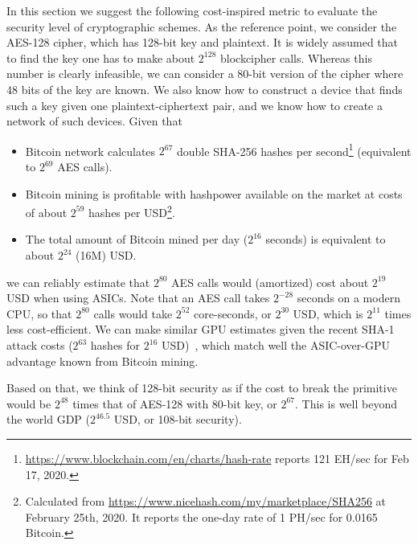 \documentclass[a4paper]{article}
\begin{document}
In this section we suggest the following cost-inspired metric to evaluate the security level of cryptographic schemes. As the reference point, we consider the AES-128 cipher, which has 128-bit key and plaintext. It is widely assumed that to find the key one has to make about $2^{128}$ blockcipher calls. Whereas this number is clearly infeasible, we can consider a 80-bit version of the cipher where 48 bits of the key are known.  We also know how to construct a device that finds such a key given one plaintext-ciphertext pair, and we know how to create a network of such devices.
Given that
\begin{itemize}
    \item Bitcoin network calculates $2^{67}$ double SHA-256 hashes per second\footnote{\url{https://www.blockchain.com/en/charts/hash-rate} reports 121 EH/sec for Feb 17, 2020.} (equivalent to $2^{69}$ AES calls).
    \item Bitcoin mining is profitable with hashpower available on the market at costs of about $2^{59}$ hashes per USD\footnote{Calculated from \url{https://www.nicehash.com/my/marketplace/SHA256} at February 25th, 2020. It reports the one-day rate of 1 PH/sec for 0.0165 Bitcoin.}.
    \item The total amount of Bitcoin mined per day ($2^{16}$ seconds) is equivalent to about $2^{24}$ (16M) USD.
\end{itemize}
we can reliably estimate that $2^{80}$ AES calls would (amortized) cost about  $2^{19}$ USD when using ASICs. Note that an AES call takes $2^{-28}$ seconds on a modern CPU, so that $2^{80}$ calls would take $2^{52}$ core-seconds, or $2^{30}$ USD, which is $2^{11}$ times less cost-efficient. 
We can make similar GPU estimates given the recent SHA-1 attack costs ($2^{63}$ hashes for $2^{16}$ USD)~\cite{cryptoeprint:2020:014}, which match well the ASIC-over-GPU advantage known from Bitcoin mining.

Based on that, we think of 128-bit security as if the cost to break the primitive would be $2^{48}$ times that of AES-128 with 80-bit key, or $2^{67}$. This is well beyond the world GDP ($2^{46.5}$ USD, or 108-bit security). 
\end{document}
